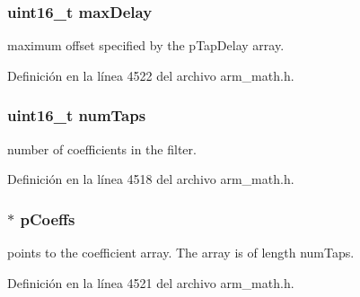 \subsubsection[{\texorpdfstring{max\+Delay}{maxDelay}}]{\setlength{\rightskip}{0pt plus 5cm}uint16\+\_\+t max\+Delay}\hypertarget{structarm__fir__sparse__instance__q15_ab25f4ee7550e6d92acff77ada283733f}{}\label{structarm__fir__sparse__instance__q15_ab25f4ee7550e6d92acff77ada283733f}
maximum offset specified by the p\+Tap\+Delay array. 

Definición en la línea 4522 del archivo arm\+\_\+math.\+h.

\subsubsection[{\texorpdfstring{num\+Taps}{numTaps}}]{\setlength{\rightskip}{0pt plus 5cm}uint16\+\_\+t num\+Taps}\hypertarget{structarm__fir__sparse__instance__q15_a751941891e47f522a7f5375fe8990aac}{}\label{structarm__fir__sparse__instance__q15_a751941891e47f522a7f5375fe8990aac}
number of coefficients in the filter. 

Definición en la línea 4518 del archivo arm\+\_\+math.\+h.

\subsubsection[{\texorpdfstring{p\+Coeffs}{pCoeffs}}]{$\ast$ p\+Coeffs}\hypertarget{structarm__fir__sparse__instance__q15_a7ca181a37f714d174445f486bebce26f}{}\label{structarm__fir__sparse__instance__q15_a7ca181a37f714d174445f486bebce26f}
points to the coefficient array. The array is of length num\+Taps. 

Definición en la línea 4521 del archivo arm\+\_\+math.\+h.

